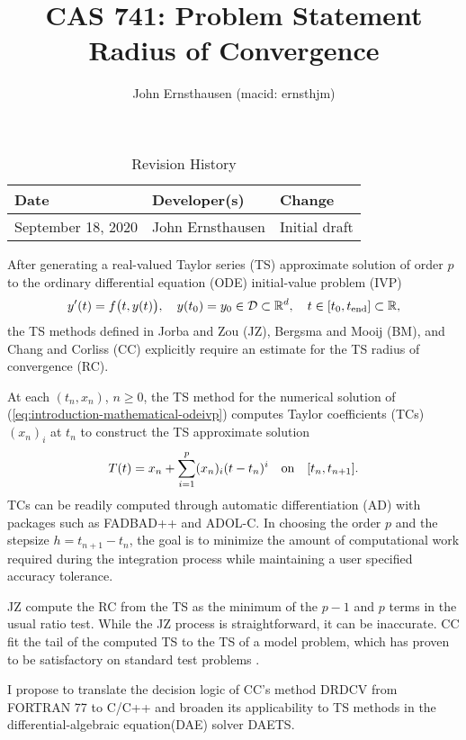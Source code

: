 \documentclass{article}
\title{CAS 741: Problem Statement\\Radius of Convergence}
\author{John Ernsthausen (macid: ernsthjm)}
\date{}
\newcommand{\EQ}[1]{\begin{align} {#1} \end{align}}
\newcommand{\ode}{{\footnotesize ODE}\xspace}
\newcommand{\dae}{{\footnotesize DAE}\xspace}
\newcommand{\ivp}{{\footnotesize IVP}\xspace}
\newcommand{\fadbad}{{\footnotesize FADBAD++}\xspace}
\newcommand{\plainc}{{\footnotesize C}\xspace}
\newcommand{\cpp}{{\footnotesize C++}\xspace}
\newcommand{\adolc}{{\footnotesize ADOL-C}\xspace}
\newcommand{\rdcon}{{\footnotesize DRDCV}\xspace}
\newcommand{\fortran}{{\footnotesize FORTRAN 77}\xspace}
\newcommand{\daets}{{\footnotesize DAETS}\xspace}
\newcommand{\parn}[1]{( {#1} )}
\newcommand{\pbg}[1]{\bigl(  {#1} \bigr)}
\def\Rz{\mathbb{R}}
\newcommand{\iode}{\protect{\makebox{$[t_0,\tend]$}}\xspace}
\newcommand{\lode}{\protect{\makebox{$[t_n,t_{n+1}]$}}\xspace}
\newcommand{\tend}{t_\text{end}}
\newcommand{\tc}[2]{(#1)_{#2}}
\newcommand{\Tp}{T}
\newcommand{\xn}{x_{n}}
\newcommand{\tn}{t_{n}}
\renewcommand{\eqref}[1]{(\ref{eq:#1})}
\begin{document}
\maketitle

\begin{table}[hp]
\caption{Revision History} \label{TblRevisionHistory}
\begin{tabularx}{\textwidth}{llX}
\toprule
\textbf{Date} & \textbf{Developer(s)} & \textbf{Change}\\
\midrule
September 18, 2020 & John Ernsthausen & Initial draft\\
\bottomrule
\end{tabularx}
\end{table}

After generating a real-valued Taylor series (TS) approximate solution of order $p$ to the
ordinary differential equation (\ode) initial-value problem (\ivp) 
\EQ
{
  \label{eq:introduction-mathematical-odeivp}
  y'\parn{t} = f\pbg{t,y\parn{t}},
  \quad
  y\parn{t_0} = y_0 \in \mathcal D \subset \Rz^d,
  \quad
  t \in \iode \subset \Rz,
}
the TS methods defined in
Jorba and Zou \cite{jorba2005software} (JZ),
Bergsma and Mooij \cite{bergsma2016application} (BM),
and
Chang and Corliss \cite{chang1982} (CC)
explicitly require an estimate for the TS radius of convergence (RC).

At each $\parn{t_n,x_n}$, $n \geq 0$, the TS method for the numerical solution
of \eqref{introduction-mathematical-odeivp} computes Taylor coefficients (TCs)
$\tc{\xn}{i}$ at $t_{n}$ to construct the TS approximate solution
\begin{align}
  \label{eq:tss}
  \Tp(t) = \xn + \sum_{i=1}^{p}\tc{\xn}{i}(t-\tn)^{i} \quad\mbox{on}\quad \lode.
\end{align}
TCs can be readily computed through automatic differentiation (AD) with packages
such as \fadbad \cite{FADBAD++} and \adolc \cite{GriewankADBook2/e}.
In choosing the order $p$ and the stepsize $h = t_{n+1} - t_n$, the goal is to minimize the amount
of computational work required during the integration process while maintaining a user specified accuracy tolerance. 

JZ compute the RC from the TS as the minimum of the $p-1$ and $p$ terms in the usual ratio test.
While the JZ process is straightforward, it can be inaccurate.
CC fit the tail of the computed TS to the TS of a model problem, which has proven to be satisfactory
on standard test problems \cite{enright1987examples}.

I propose to translate the decision logic of CC's method \rdcon from \fortran to \plainc/\cpp
and broaden its applicability to TS methods in the differential-algebraic equation(\dae{}) solver
\daets.

%  
%  

 

\end{document}
